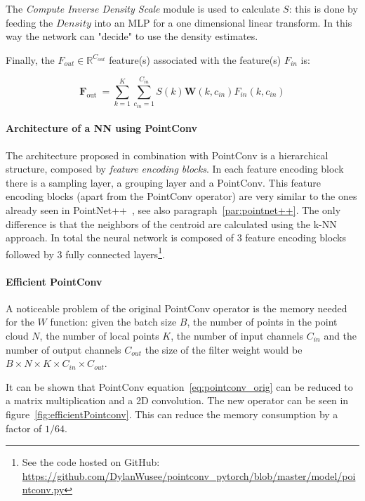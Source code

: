 The \textit{Compute Inverse Density Scale} module is used to calculate $S$: this is done by feeding the $Density$ into an MLP for a one dimensional linear transform. In this way the network can "decide" to use the density estimates.

Finally, the $F_{out} \in \mathbb{R}^{C_{out}}$ feature(s) associated with the feature(s) $F_{in}$ is:

\begin{equation}\label{eq:pointconv_orig}
\mathbf{F}_{\text {out }}=\sum_{k=1}^{K} \sum_{c_{i n}=1}^{C_{i n}} S(k) \mathbf{W}\left(k, c_{i n}\right) F_{i n}\left(k, c_{i n}\right)
\end{equation}

\paragraph{Architecture of a NN using PointConv} The architecture proposed in combination with PointConv is a hierarchical structure, composed by \textit{feature encoding blocks}. In each feature encoding block there is a sampling layer, a grouping layer and a PointConv. This feature encoding blocks (apart from the PointConv operator) are very similar to the ones already seen in PointNet++~\cite{qi2017pointnet++}, see also paragraph~\ref{par:pointnet++}. The only difference is that the neighbors of the centroid are calculated using the k-NN approach. In total the neural network is composed of 3 feature encoding blocks followed by 3 fully connected layers\footnote{See the code hosted on GitHub: \url{https://github.com/DylanWusee/pointconv_pytorch/blob/master/model/pointconv.py}}.

\paragraph{Efficient PointConv} A noticeable problem of the original PointConv operator is the memory needed for the $W$ function: given the batch size $B$, the number of points in the point cloud $N$, the number of local points $K$, the number of input channels $C_{in}$ and the number of output channels $C_{out}$ the size of the filter weight would be $B \times N \times K \times C_{in} \times C_{out}$.

It can be shown that PointConv equation~\ref{eq:pointconv_orig} can be reduced to a matrix multiplication and a 2D convolution. The new operator can be seen in figure~\ref{fig:efficientPointconv}. This can reduce the memory consumption by a factor of $1 / 64$.

